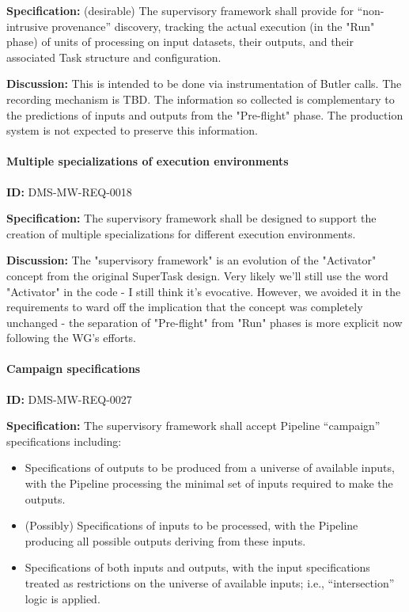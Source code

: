 \documentclass[SE,toc,lsstdraft]{lsstdoc}
\begin{document}
\textbf{Specification:}
(desirable) The supervisory framework shall provide for “non-intrusive provenance” discovery, tracking the actual execution (in the "Run" phase) of units of processing on input datasets, their outputs, and their associated Task structure and configuration.

\textbf{Discussion:}
This is intended to be done via instrumentation of Butler calls. The recording mechanism is TBD. The information so collected is complementary to the predictions of inputs and outputs from the "Pre-flight" phase. The production system is not expected to preserve this information.

\paragraph{Multiple specializations of execution environments}\hfill  %

\label{DMS-MW-REQ-0018}
\textbf{ID:} DMS-MW-REQ-0018

\textbf{Specification:}
The supervisory framework shall be designed to support the creation of multiple specializations for different execution environments.

\textbf{Discussion:}
The "supervisory framework" is an evolution of the "Activator" concept from the original SuperTask design. Very likely we'll still use the word "Activator" in the code - I still think it's evocative. However, we avoided it in the requirements to ward off the implication that the concept was completely unchanged - the separation of "Pre-flight" from "Run" phases is more explicit now following the WG's efforts.

\paragraph{Campaign specifications}\hfill  %

\label{DMS-MW-REQ-0027}
\textbf{ID:} DMS-MW-REQ-0027

\textbf{Specification:}
The supervisory framework shall accept Pipeline “campaign” specifications including:

    \begin{itemize}
\item
Specifications of outputs to be produced from a universe of available inputs, with the Pipeline processing the minimal set of inputs required to make the outputs.

\item
(Possibly) Specifications of inputs to be processed, with the Pipeline producing all possible outputs deriving from these inputs.

\item
Specifications of both inputs and outputs, with the input specifications treated as restrictions on the universe of available inputs; i.e., “intersection” logic is applied.

    \end{itemize}
\end{document}
